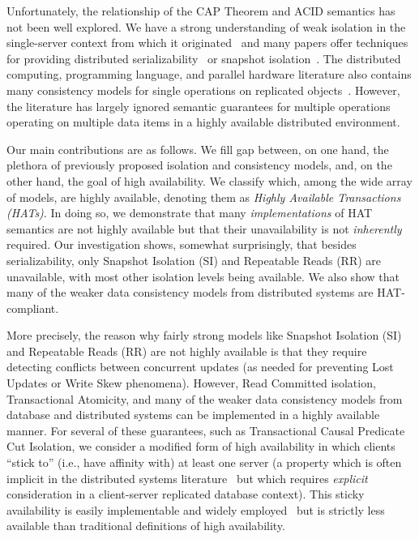 Unfortunately, the relationship of the CAP Theorem and ACID semantics
has not been well explored. We have a strong understanding of weak
isolation in the single-server context from which it
originated~\cite{adya, ansicritique, gray-isolation} and many papers
offer techniques for providing distributed
serializability~\cite{bernstein-book, hstore, kemme-classification,
  spanner, daudjee-session, krikellas-bargain, calvin} or
snapshot isolation~\cite{daudjee-snapshot,generalizedsnapshot,
  kemme-snapshot, walter}. The distributed computing, programming
language, and parallel hardware literature also contains many
consistency models for single operations on replicated
objects~\cite{pnuts, herlihy-art,  eiger, cac, sessionguarantees,
  ceri-mechanism, chen-mechanism}. However, the literature has largely
ignored semantic guarantees for multiple operations operating on
multiple data items in a highly available distributed environment.

Our main contributions are as follows. We fill gap between, on one
hand, the plethora of previously proposed isolation and consistency
models, and, on the other hand, the goal of high availability.  We
classify which, among the wide array of models, are highly available,
denoting them as {\em Highly Available Transactions (HATs)}. In doing
so, we demonstrate that many \textit{implementations} of HAT semantics
are not highly available but that their unavailability is not
\textit{inherently} required. Our investigation shows, somewhat
surprisingly, that besides serializability, only Snapshot Isolation
(SI) and Repeatable Reads (RR) are unavailable, with most other
isolation levels being available. We also show that many of the weaker
data consistency models from distributed systems are HAT-compliant.

More precisely, the reason why fairly strong models like Snapshot
Isolation (SI) and Repeatable Reads (RR) are not highly available is
that they require detecting conflicts between concurrent updates (as
needed for preventing Lost Updates or Write Skew phenomena). However,
Read Committed isolation, Transactional Atomicity, and many of the
weaker data consistency models from database and distributed systems
can be implemented in a highly available manner. For several of these
guarantees, such as Transactional Causal Predicate Cut Isolation, we
consider a modified form of high availability in which clients ``stick
to'' (i.e., have affinity with) at least one server (a property which
is often implicit in the distributed systems
literature~\cite{herlihy-art,  eiger, cac} but which requires
\textit{explicit} consideration in a client-server replicated database
context). This sticky availability is easily implementable and
widely employed~\cite{eiger, vogels-defs} but is strictly less
available than traditional definitions of high availability.

